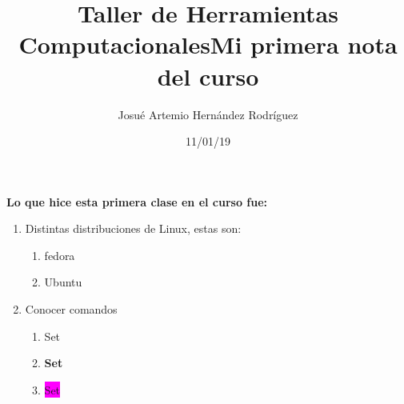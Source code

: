\documentclass[letterpaper, 12pt, oneside]{article}%
\title{\Huge Taller de Herramientas Computacionales}
\author{Josué Artemio Hernández Rodríguez}
\date{11/01/19}
\begin{document}
    \maketitle
    \newpage
    
    \title{\Huge Mi primera nota del curso\\}
    
    \textbf{Lo que hice esta primera clase en el curso fue:}
    
    \begin{enumerate}
    \item Distintas distribuciones de Linux, estas son:
      \begin{enumerate}
      	   \item fedora
      	   \item Ubuntu
      \end{enumerate}
    \item Conocer comandos
    \begin{enumerate}
    	\item \color{red} Set
    	\item \color{magenta} \textbf{Set}
    	\item \colorbox{magenta} {Set}
    \end{enumerate}
    
    
    \end{enumerate}
    
    
\end{document}

